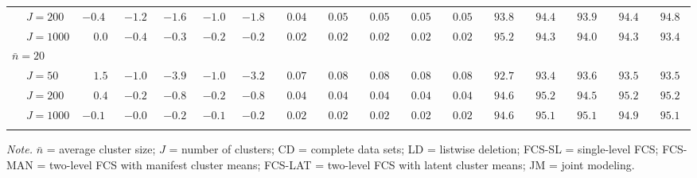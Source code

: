 \begin{sidewaystable}
\begin{threeparttable}
\begin{tabular}{llccccccccccccccc}
 & \nopagebreak $\;J=200$  & ${-}0.4\phantom{0}$ & ${-}1.2\phantom{0}$ & ${-}1.6\phantom{0}$ & ${-}1.0\phantom{0}$ & ${-}1.8\phantom{0}$ & $\phantom{0}0.04\phantom{0}$ & $\phantom{0}0.05\phantom{0}$ & $\phantom{0}0.05\phantom{0}$ & $\phantom{0}0.05\phantom{0}$ & $\phantom{0}0.05\phantom{0}$ & $\phantom{0}93.8\phantom{0}$ & $\phantom{0}94.4\phantom{0}$ & $\phantom{0}93.9\phantom{0}$ & $\phantom{0}94.4\phantom{0}$ & $\phantom{0}94.8\phantom{0}$ \\
 & \nopagebreak $\;J=1000$  & $\phantom{-}0.0\phantom{0}$ & ${-}0.4\phantom{0}$ & ${-}0.3\phantom{0}$ & ${-}0.2\phantom{0}$ & ${-}0.2\phantom{0}$ & $\phantom{0}0.02\phantom{0}$ & $\phantom{0}0.02\phantom{0}$ & $\phantom{0}0.02\phantom{0}$ & $\phantom{0}0.02\phantom{0}$ & $\phantom{0}0.02\phantom{0}$ & $\phantom{0}95.2\phantom{0}$ & $\phantom{0}94.3\phantom{0}$ & $\phantom{0}94.0\phantom{0}$ & $\phantom{0}94.3\phantom{0}$ & $\phantom{0}93.4\phantom{0}$ \\
\multicolumn{4}{l}{$\bar{n}=20$} \\  & \nopagebreak $\;J=50$  & $\phantom{-}1.5\phantom{0}$ & ${-}1.0\phantom{0}$ & ${-}3.9\phantom{0}$ & ${-}1.0\phantom{0}$ & ${-}3.2\phantom{0}$ & $\phantom{0}0.07\phantom{0}$ & $\phantom{0}0.08\phantom{0}$ & $\phantom{0}0.08\phantom{0}$ & $\phantom{0}0.08\phantom{0}$ & $\phantom{0}0.08\phantom{0}$ & $\phantom{0}92.7\phantom{0}$ & $\phantom{0}93.4\phantom{0}$ & $\phantom{0}93.6\phantom{0}$ & $\phantom{0}93.5\phantom{0}$ & $\phantom{0}93.5\phantom{0}$ \\
 & \nopagebreak $\;J=200$  & $\phantom{-}0.4\phantom{0}$ & ${-}0.2\phantom{0}$ & ${-}0.8\phantom{0}$ & ${-}0.2\phantom{0}$ & ${-}0.8\phantom{0}$ & $\phantom{0}0.04\phantom{0}$ & $\phantom{0}0.04\phantom{0}$ & $\phantom{0}0.04\phantom{0}$ & $\phantom{0}0.04\phantom{0}$ & $\phantom{0}0.04\phantom{0}$ & $\phantom{0}94.6\phantom{0}$ & $\phantom{0}95.2\phantom{0}$ & $\phantom{0}94.5\phantom{0}$ & $\phantom{0}95.2\phantom{0}$ & $\phantom{0}95.2\phantom{0}$ \\
 & \nopagebreak $\;J=1000$  & ${-}0.1\phantom{0}$ & ${-}0.0\phantom{0}$ & ${-}0.2\phantom{0}$ & ${-}0.1\phantom{0}$ & ${-}0.2\phantom{0}$ & $\phantom{0}0.02\phantom{0}$ & $\phantom{0}0.02\phantom{0}$ & $\phantom{0}0.02\phantom{0}$ & $\phantom{0}0.02\phantom{0}$ & $\phantom{0}0.02\phantom{0}$ & $\phantom{0}94.6\phantom{0}$ & $\phantom{0}95.1\phantom{0}$ & $\phantom{0}95.1\phantom{0}$ & $\phantom{0}94.9\phantom{0}$ & $\phantom{0}95.1\phantom{0}$ \\
[0.5ex]\hline\\[-1.6ex] 
\end{tabular}
\begin{tablenotes}{\footnotesize \textit{Note.} $\bar{n}$ = average cluster size; $J$ = number of clusters; CD = complete data sets; LD = listwise deletion; FCS-SL = single-level FCS; FCS-MAN = two-level FCS with manifest cluster means; FCS-LAT = two-level FCS with latent cluster means; JM = joint modeling.}\end{tablenotes}
\end{threeparttable}
\end{sidewaystable}
